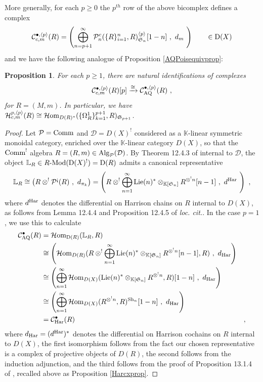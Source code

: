 \documentclass[11pt]{amsart}
\numberwithin{equation}{section}
\newtheorem{prop}[theo]{Proposition}
\theoremstyle{definition}
\newcommand{\bb}{\mathbb}
\newcommand{\mc}{\mathcal}
\newcommand{\mf}{\mathfrak}
\newcommand{\Har}{{\textup{Har}}}
\newcommand{\AQ}{{\textup{AQ}}}
\newcommand{\bL}{{\mathbb{L}}}
\newcommand{\Mod}{{\textup{-Mod}}}
\newcommand{\K}{{\bb K}}
\newcommand{\Sh}{{\textup{Sh}}}
\newcommand{\Alg}{{\textup{Alg}}}
\newcommand{\Comm}{{\textup{Comm}}}
\newcommand{\Lie}{{\textup{Lie}}}
\newcommand{\Homi}{{\mc H\textup{om}}}
\newcommand{\ash}{{\textup{\mbox{!`}}}}
\newcommand{\Ss}{{{\mf{S}}}}
\newcommand{\0}{{\textbf{0}}}
\newcommand{\Dd}{{\textup{D}}}
\newcommand{\DD}{{D}}
\def \mf{\mathfrak}
\begin{document}
More generally, for each $p\geq 0$ the $p^{th}$ row of the above bicomplex defines a complex
\[ \mc C^{\bullet,\langle p \rangle}_{c,m}(R)= \left(\bigoplus_{n=p+1}^\infty \mc  P_n^c(\{ R\}_{i=1}^n,R)_{\Ss_n}^{\langle p \rangle} [1-n] \ , \ d_{m} \ \right) \qquad \in \Dd(X) \]
and we have the following analogue of Proposition \ref{AQPoisequivprop}:

\begin{prop}\label{AQPoischequivintprop} For each $p\geq 1$, there are natural identifications of complexes
	\[ \mc C^{\bullet,\langle p \rangle}_{c,m}(R)[p] \xrightarrow{\cong} \mc C^{\bullet,\langle p \rangle}_\AQ(R) \ , \]
	for $R=(M,m)$. In particular, we have $\mc H^{p,\langle p \rangle}_{c,m}(R) \cong \Homi_{\DD(R)^*}(\{\Omega^1_R\}_{k=1}^{p+1},R)_{\Ss_{p+1}} $.
\end{prop}
\begin{proof}
Let $\mc P=\Comm$ and $\mc D=\DD(X)^!$ considered as a $\K$-linear symmetric monoidal category, enriched over the $\K$-linear category $\DD(X)$, so that the $\Comm^!$ algebra $R=(R,m)\in \Alg_{\mc P}(\mc D)$. By Theorem 12.4.3 of \cite{LV} internal to $\mc D$, the object $\bL_R \in R\Mod(\Dd(X)^!)=\Dd(R) $ admits a canonical representative
\[\bL_R \cong \left( R\otimes^! \mc P^\ash(R) \ , \ d_{\pi_k} \right) = \left( R \otimes^! \bigoplus_{n=1}^\infty \Lie(n)^*\otimes_{\K[\Ss_n]} R^{\otimes^! n}[n-1] \ , \ d^{\Har} \   \right) \ ,  \]
where $d^{\Har}$ denotes the differential on Harrison chains on $R$ internal to $\DD(X)$, as follows from Lemma 12.4.4 and Proposition 12.4.5 of \emph{loc. cit.}. In the case $p=1$, we use this to calculate
\begin{align*}
\mc C^\bullet_\AQ(R) & = \Homi_{\Dd(R)}(\bL_R,R) \\
& \cong \left(  \Homi_{\DD(R)}(R \otimes^! \bigoplus_{n=1}^\infty \Lie(n)^*\otimes_{\K[\Ss_n]} R^{\otimes^! n}[n-1] , R ) \ , \ d_{\Har} \right)  \\
& \cong \left( \bigoplus_{n=1}^\infty\Homi_{\DD(X)}( \Lie(n)^*\otimes_{\K[\Ss_n]} R^{\otimes^! n} , R )[1-n]   \ , \ d_{\Har} \right) \\
& \cong \left( \bigoplus_{n=1}^\infty\Homi_{\DD(X)}( R^{\otimes^! n} , R )^{\Sh_n}[1-n]   \ , \ d_{\Har} \right) \\
& = \mc C_\Har^\bullet(R)  & , 
\end{align*}
where $d_\Har=(d^\Har)^*$ denotes the differential on Harrison cochains on $R$ internal to $\DD(X)$, the first isomorphism follows from the fact our chosen representative is a complex of projective objects of $\DD(R)$, the second follows from the induction adjunction, and the third follows from the proof of Proposition 13.1.4 of \cite{LV}, recalled above as Proposition \ref{Harcxprop}.


\end{proof}
\end{document}
